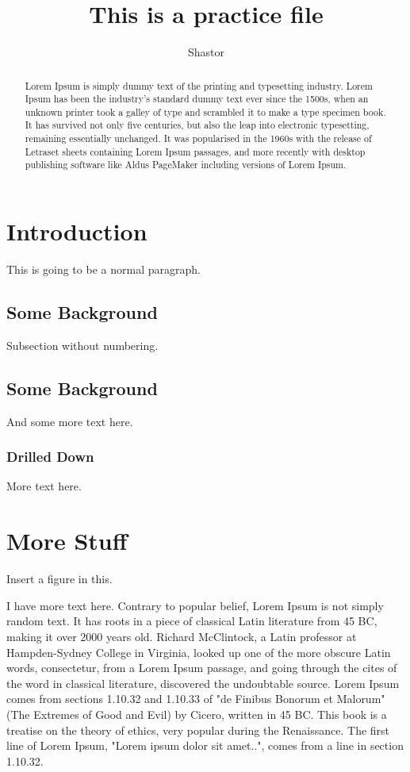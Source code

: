 \documentclass{article}
\title{This is a practice file}
\author{Shastor}
\begin{document}
\maketitle

\begin{abstract}

Lorem Ipsum is simply dummy text of the printing and typesetting industry. Lorem Ipsum has been the industry's standard dummy text ever since the 1500s, when an unknown printer took a galley of type and scrambled it to make a type specimen book. It has survived not only five centuries, but also the leap into electronic typesetting, remaining essentially unchanged. It was popularised in the 1960s with the release of Letraset sheets containing Lorem Ipsum passages, and more recently with desktop publishing software like Aldus PageMaker including versions of Lorem Ipsum.

\end{abstract}

\section{Introduction}
This is going to be a  normal paragraph.

\subsection*{Some Background}
Subsection without numbering.

\subsection{Some Background}
And some more text here.

\subsubsection{Drilled Down}\label{sec:drilled-down}
More text here.

\section{More Stuff}

Insert a figure in this.

I have more text here.
Contrary to popular belief, Lorem Ipsum is not simply random text. It has roots in a piece of classical Latin literature from 45 BC, making it over 2000 years old. Richard McClintock, a Latin professor at Hampden-Sydney College in Virginia, looked up one of the more obscure Latin words, consectetur, from a Lorem Ipsum passage, and going through the cites of the word in classical literature, discovered the undoubtable source. Lorem Ipsum comes from sections 1.10.32 and 1.10.33 of "de Finibus Bonorum et Malorum" (The Extremes of Good and Evil) by Cicero, written in 45 BC. This book is a treatise on the theory of ethics, very popular during the Renaissance. The first line of Lorem Ipsum, "Lorem ipsum dolor sit amet..", comes from a line in section 1.10.32.
\end{document}
